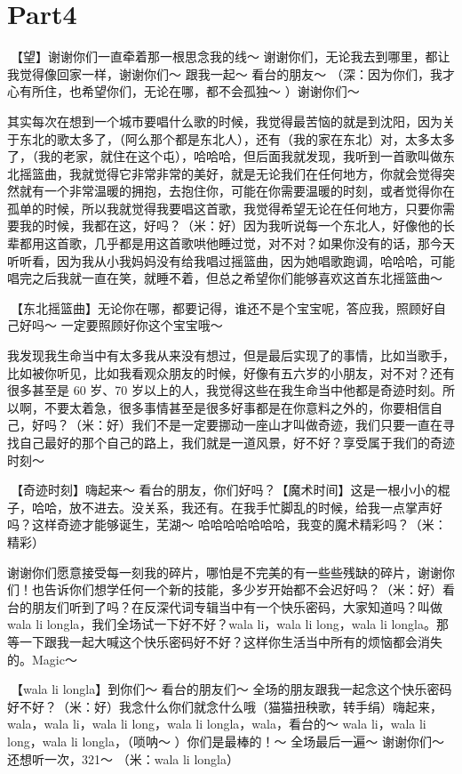 \documentclass[
]{book}
\begin{document}
\section{Part4}\label{shenyang-20240907-part4}

🎵【望】谢谢你们一直牵着那一根思念我的线～ 谢谢你们，无论我去到哪里，都让我觉得像回家一样，谢谢你们～ 跟我一起～ 看台的朋友～ （深：因为你们，我才心有所住，也希望你们，无论在哪，都不会孤独～ ）谢谢你们～

其实每次在想到一个城市要唱什么歌的时候，我觉得最苦恼的就是到沈阳，因为关于东北的歌太多了，（阿么那个都是东北人），还有（我的家在东北）对，太多太多了，（我的老家，就住在这个屯），哈哈哈，但后面我就发现，我听到一首歌叫做东北摇篮曲，我就觉得它非常非常的美好，就是无论我们在任何地方，你就会觉得突然就有一个非常温暖的拥抱，去抱住你，可能在你需要温暖的时刻，或者觉得你在孤单的时候，所以我就觉得我要唱这首歌，我觉得希望无论在任何地方，只要你需要我的时候，我都在这，好吗？（米：好）因为我听说每一个东北人，好像他的长辈都用这首歌，几乎都是用这首歌哄他睡过觉，对不对？如果你没有的话，那今天听听看，因为我从小我妈妈没有给我唱过摇篮曲，因为她唱歌跑调，哈哈哈，可能唱完之后我就一直在笑，就睡不着，但总之希望你们能够喜欢这首东北摇篮曲～

🎵【东北摇篮曲】无论你在哪，都要记得，谁还不是个宝宝呢，答应我，照顾好自己好吗～ 一定要照顾好你这个宝宝哦～

我发现我生命当中有太多我从来没有想过，但是最后实现了的事情，比如当歌手，比如被你听见，比如我看观众朋友的时候，好像有五六岁的小朋友，对不对？还有很多甚至是 60 岁、70 岁以上的人，我觉得这些在我生命当中他都是奇迹时刻。所以啊，不要太着急，很多事情甚至是很多好事都是在你意料之外的，你要相信自己，好吗？（米：好）我们不是一定要挪动一座山才叫做奇迹，我们只要一直在寻找自己最好的那个自己的路上，我们就是一道风景，好不好？享受属于我们的奇迹时刻～

🎵【奇迹时刻】嗨起来～ 看台的朋友，你们好吗？【魔术时间】这是一根小小的棍子，哈哈，放不进去。没关系，我还有。在我手忙脚乱的时候，给我一点掌声好吗？这样奇迹才能够诞生，芜湖～ 哈哈哈哈哈哈哈，我变的魔术精彩吗？（米：精彩）

谢谢你们愿意接受每一刻我的碎片，哪怕是不完美的有一些些残缺的碎片，谢谢你们！也告诉你们想学任何一个新的技能，多少岁开始都不会迟好吗？（米：好）看台的朋友们听到了吗？在反深代词专辑当中有一个快乐密码，大家知道吗？叫做wala li longla，我们全场试一下好不好？wala li，wala li long，wala li longla。那等一下跟我一起大喊这个快乐密码好不好？这样你生活当中所有的烦恼都会消失的。Magic～

🎵【wala li longla】到你们～ 看台的朋友们～ 全场的朋友跟我一起念这个快乐密码好不好？（米：好）我念什么你们就念什么哦（猫猫扭秧歌，转手绢）嗨起来，wala，wala li，wala li long，wala li longla，wala，看台的～ wala li，wala li long，wala li longla，（唢呐～ ）你们是最棒的！～ 全场最后一遍～ 谢谢你们～ 还想听一次，321～ （米：wala li longla）
\end{document}
